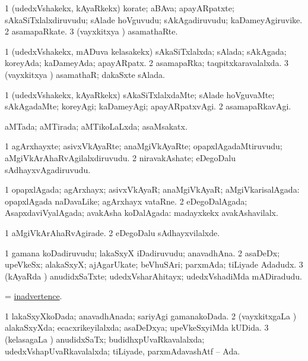 \bentry
{}
\gl{\nA}
\bmng
\bnum
\num{1} (udedxVshakekx, kAyaRkekx) korate; aBAva; apayARpatxte; sAkaSiTxlalxdiruvudu; sAlade hoVguvudu; sAkAgadiruvudu; kaDameyAgiruvike. 
\num{2} asamapaRkate. 
\num{3} (vayxkitxya \vi) asamathaRte. 
\enum
\emng
\eentry

\bentry
{}
\gl{\gu}
\bmng
\bnum
\num{1} (udedxVshakekx, mADuva kelasakekx) sAkaSiTxlalxda; sAlada; sAkAgada; koreyAda; kaDameyAda; apayARpatx. 
\num{2} asamapaRka; taqpitxkaravalalxda. 
\num{3} (vayxkitxya \vi) asamathaR; dakaSxte sAlada. 
\enum
\emng
\eentry

\bentry
{}
\gl{\kirxvi}
\bmng
\bnum
\num{1} (udedxVshakekx, kAyaRkekx) sAkaSiTxlalxdaMte; sAlade hoVguvaMte; sAkAgadaMte; koreyAgi; kaDameyAgi; apayARpatxvAgi. 
\num{2} asamapaRkavAgi. 
\enum
\emng
\eentry

\bentry
{}
\gl{\gu}
\bmng
aMTada; aMTirada; aMTikoLaLxda; asaMsakatx. 
\emng
\eentry

\bentry
{}
\gl{\nA}
\bmng
\bnum
\num{1} agArxhayxte; asivxVkAyaRte; anaMgiVkAyaRte; opapxlAgadaMtiruvudu; aMgiVkArAhaRvAgilalxdiruvudu. 
\num{2} niravakAshate; eDegoDalu sAdhayxvAgadiruvudu. 
\enum
\emng
\eentry

\bentry
{}
\gl{\gu}
\bmng
\bnum
\num{1} opapxlAgada; agArxhayx; asivxVkAyaR; anaMgiVkAyaR; aMgiVkarisalAgada:  opapxlAgada naDavaLike; agArxhayx vataRne. 
\num{2} eDegoDalAgada; AsapxdaviVyalAgada; avakAsha koDalAgada:  madayxkekx avakAshavilalx. 
\enum
\emng
\eentry

\bentry
{}
\gl{\kirxvi}
\bmng
\bnum
\num{1} aMgiVkArAhaRvAgirade. 
\num{2} eDegoDalu sAdhayxvilalxde. 
\enum
\emng
\eentry

\bentry
{}
\gl{\nA}
\bmng
\bnum
\num{1} gamana koDadiruvudu; lakaSxyX iDadiruvudu; anavadhAna. 
\num{2} asaDeDx; upeVkeSx; alakaSxyX; ajAgarUkate; beVhuSAri; parxmAda; tiLiyade Adadudx. 
\num{3} (kAyaRda \vi) anudidxSaTxte; udedxVsharAhitayx; udedxVshadiMda mADiradudu. 
\enum
\emng
\eentry

\bentry
{}
\gl{\nA}
\bmng
 = \hyperlink{inadvertence}{inadvertence}. 
\emng
\eentry

\bentry
{}
\gl{\gu}
\bmng
\bnum
\num{1} lakaSxyXkoDada; anavadhAnada; sariyAgi gamanakoDada. 
\num{2} (vayxkitxgaLa \vi) alakaSxyXda; ecacxrikeyilalxda; asaDeDxya; upeVkeSxyiMda kUDida. 
\num{3} (kelasagaLa \vi) anudidxSaTx; budidhxpUvaRkavalalxda; udedxVshapUvaRkavalalxda; tiLiyade, parxmAdavashAtf -- Ada. 
\enum
\emng
\eentry

